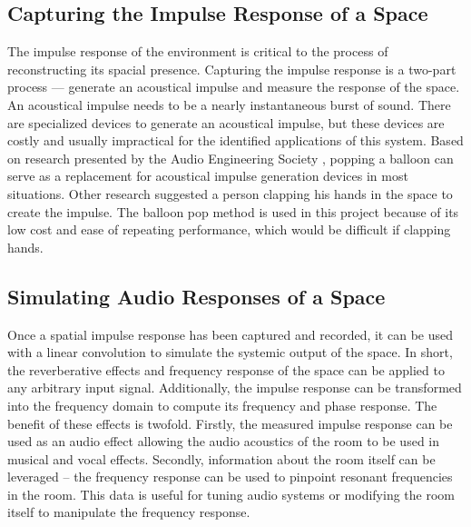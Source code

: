 \documentclass[letterpaper, 11pt, onecolumn, oneside]{article}
\begin{document}
    \subsection*{Capturing the Impulse Response of a Space}
    The impulse response of the environment is critical to the process of reconstructing its spacial presence.
    Capturing the impulse response is a two-part process --- generate an acoustical impulse and measure the response of the space.
    An acoustical impulse needs to be a nearly instantaneous burst of sound.
    There are specialized devices to generate an acoustical impulse, but these devices are costly and usually impractical for the identified applications of this system.
    Based on research presented by the Audio Engineering Society \cite{abel2010estimating}, popping a balloon can serve as a replacement for acoustical impulse generation devices in most situations.
    Other research suggested a person clapping his hands in the space to create the impulse.
    The balloon pop method is used in this project because of its low cost and ease of repeating performance, which would be difficult if clapping hands.

    \subsection*{Simulating Audio Responses of a Space}
    Once a spatial impulse response has been captured and recorded, it can be used with a linear convolution to simulate the systemic output of the space. In short, the reverberative effects and frequency response of the space can be applied to any arbitrary input signal. Additionally, the impulse response can be transformed into the frequency domain to compute its frequency and phase response. The benefit of these effects is twofold. Firstly, the measured impulse response can be used as an audio effect allowing the audio acoustics of the room to be used in musical and vocal effects. Secondly, information about the room itself can be leveraged -- the frequency response can be used to pinpoint resonant frequencies in the room. This data is useful for tuning audio systems or modifying the room itself to manipulate the frequency response.

\end{document}
